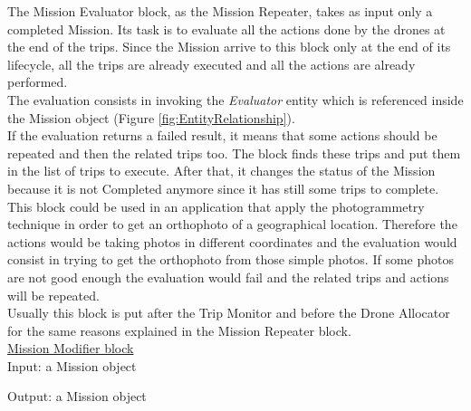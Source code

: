 The Mission Evaluator block, as the Mission Repeater, takes as input only a completed Mission.
Its task is to evaluate all the actions done by the drones at the end of the trips.
Since the Mission arrive to this block only at the end of its lifecycle, all the trips are already executed and all the actions are already performed.
\\
The evaluation consists in invoking the \textit{Evaluator} entity which is referenced inside the Mission object (Figure \ref{fig:EntityRelationship}).
\\
If the evaluation returns a failed result, it means that some actions should be repeated and then the related trips too. 
The block finds these trips and put them in the list of trips to execute.
After that, it changes the status of the Mission because it is not Completed anymore since it has still some trips to complete.
\\
This block could be used in an application that apply the photogrammetry technique in order to get an orthophoto of a geographical location.
Therefore the actions would be taking photos in different coordinates and the evaluation would consist in trying to get the orthophoto from those simple photos. 
If some photos are not good enough the evaluation would fail and the related trips and actions will be repeated.
\\
Usually this block is put after the Trip Monitor and before the Drone Allocator for the same reasons explained in the Mission Repeater block.
\\

\underline{Mission Modifier block}\label{missionModifier}
\\

Input: a Mission object

Output: a Mission object
\\

